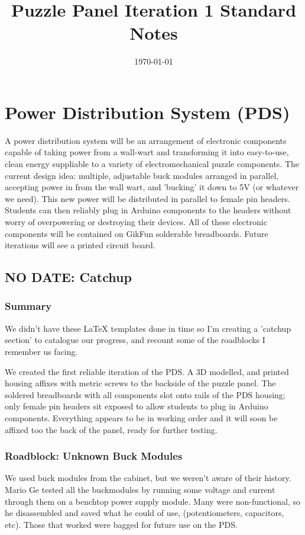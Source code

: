 \documentclass[a4paper, 10pt]{article}
\title{Puzzle Panel Iteration 1 Standard Notes}
\date{\today}
\begin{document}
\maketitle

\pagebreak

\tableofcontents

\pagebreak

\section{Power Distribution System (PDS)}
A power distribution system will be an arrangement of electronic components capable of taking power from a wall-wart and transforming it into easy-to-use, clean energy suppliable to a variety of electromechanical puzzle components. The current design idea: multiple, adjustable buck modules arranged in parallel, accepting power in from the wall wart, and 'bucking' it down to 5V (or whatever we need). This new power will be distributed in parallel to female pin headers. Students can then reliably plug in Arduino components to the headers without worry of overpowering or destroying their devices. All of these electronic components will be contained on GikFun solderable breadboards. Future iterations will see a printed circuit board.

	\subsection{NO DATE: Catchup}
		\subsubsection{Summary}
		We didn't have these LaTeX templates done in time so I'm creating a 'catchup section' to catalogue our progress, and recount some of the roadblocks I remember us facing.
		
		We created the first reliable iteration of the PDS. A 3D modelled, and printed housing affixes with metric screws to the backside of the puzzle panel. The soldered breadboards with all components slot onto rails of the PDS housing; only female pin headers sit exposed to allow students to plug in Arduino components. Everything appears to be in working order and it will soon be affixed too the back of the panel, ready for further testing.
			
			\subsubsection{Roadblock: Unknown Buck Modules}
			We used buck modules from the cabinet, but we weren't aware of their history. Mario Ge tested all the buckmodules by running some voltage and current through them on a benchtop power supply module. Many were non-functional, so he disassembled and saved what he could of use, (potentiometers, capacitors, etc). Those that worked were bagged for future use on the PDS.
			
\end{document}
